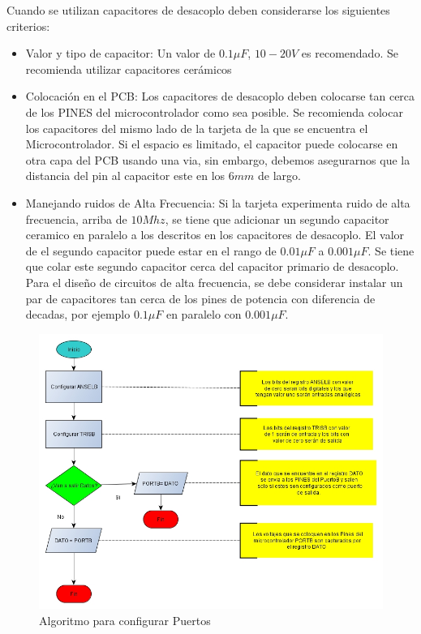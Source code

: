 \documentclass[12pt,letterpaper,twoside]{book}
\begin{document}
Cuando se utilizan capacitores de desacoplo deben considerarse los siguientes criterios:

\begin{itemize}
\item Valor y tipo de capacitor: Un valor de $0.1 \mu F$, $10-20V$ es recomendado. Se recomienda utilizar capacitores cerámicos 
\item Colocación en el PCB: Los capacitores de desacoplo deben colocarse tan cerca de los PINES del microcontrolador como sea posible. Se recomienda colocar los capacitores del mismo lado de la tarjeta de la que se encuentra el Microcontrolador. Si el espacio es limitado, el capacitor puede colocarse en otra capa del PCB usando una via, sin embargo, debemos asegurarnos que la distancia del pin al capacitor este en los $6mm$ de largo.
\item Manejando ruidos de Alta Frecuencia: Si la tarjeta experimenta ruido de alta frecuencia, arriba de $10 Mhz$, se tiene que adicionar un segundo capacitor ceramico en paralelo a los descritos en los capacitores de desacoplo. El valor de el segundo capacitor puede estar en el rango de $0.01 \mu F$ a $0.001 \mu F$. Se tiene que colar este segundo capacitor cerca del capacitor primario de desacoplo. Para el diseño de circuitos de alta frecuencia, se debe considerar instalar un par de capacitores tan cerca de los pines de potencia con diferencia de decadas, por ejemplo $0.1 \mu F$ en paralelo con $0.001 \mu F$. 
\end{itemize}

\begin{figure}
\centering
\includegraphics[width=5in]{ConfigurarPuertos.jpg}
\caption{Algoritmo para configurar Puertos}
\label{fig7}
\end{figure}
\end{document}
